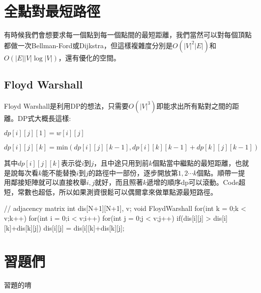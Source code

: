 \documentclass[main.tex]{subfiles}
\begin{document}
\section{全點對最短路徑}
有時候我們會想要求每一個點到每一個點間的最短距離，我們當然可以對每個頂點都做一次Bellman-Ford或Dijkstra，但這樣複雜度分別是$O(|V|^2|E|)$和$O(|E||V|\log|V|)$，還有優化的空間。
\subsection{Floyd Warshall}
Floyd Warshall是利用DP的想法，只需要$O(|V|^3)$即能求出所有點對之間的距離。DP式大概長這樣: 
\begin{center} $dp[i][j][1] = w[i][j]$ \end{center}
\begin{center} $dp[i][j][k] = \text{min}(dp[i][j][k-1], dp[i][k][k-1]+dp[k][j][k-1])$ \end{center}
其中$dp[i][j][k]$表示從$i$到$j$，且中途只用到前$k$個點當中繼點的最短距離，也就是說每次看$k$能不能替換$i$到$j$的路徑中一部份，逐步開放第$1,2\cdots k$個點。順帶一提用鄰接矩陣就可以直接枚舉$i,j$就好，而且照著$k$遞增的順序dp可以滾動。Code超短，常數也超低，所以如果測資很鬆可以偶爾拿來做單點源最短路徑。
\begin{C++}
// adjacency matrix
int dis[N+1][N+1], v;
void FloydWarshall{
	for(int k = 0;k < v;k++)
		for(int i = 0;i < v;i++)
			for(int j = 0;j < v;j++)
				if(dis[i][j] > dis[i][k]+dis[k][j])
					dis[i][j] = dis[i][k]+dis[k][j];
}
\end{C++}

\section*{習題們}
習題的唷

\end{document}
